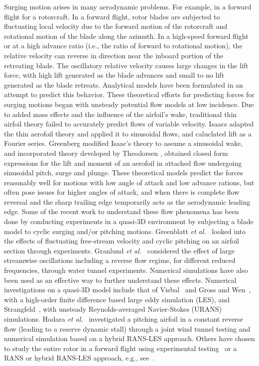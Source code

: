 Surging motion arises in many aerodynamic problems.
For example, in a forward flight for a rotorcraft.
In a forward flight, rotor blades are subjected to fluctuating local velocity due to the forward motion of the rotorcraft 
and rotational motion of the blade along the azimuth. 
In a high-speed forward flight or at a high advance ratio (i.e., the ratio of forward to rotational motion), the relative velocity 
can reverse in direction near the inboard portion of the retreating blade.
The oscillatory relative velocity causes large changes in the lift force, with high lift 
generated as the blade advances and small to no lift generated as the blade retreats. 
Analytical models have been formulated in an attempt to predict this behavior. These theoretical efforts for predicting forces for surging motions began with unsteady potential flow models at low incidence. 
Due to added mass effects and the influence of the airfoil’s wake, traditional thin airfoil theory failed to accurately predict flows of variable velocity. 
Isaacs \cite{bib:Isaacs} adapted the thin aerofoil theory and applied it to sinusoidal flows, and caluclated lift as a Fourier series.
Greenberg \cite{bib:Greenberg1947} modified Isaac's theory to assume a sinusoidal wake, and incorporated theory developed by Theodorsen \cite{bib:Theodorsen1934}, obtained closed form expressions for the lift and moment of an aerofoil in attached
flow undergoing sinusoidal pitch, surge and plunge. 
These theoretical models predict the forces reasonably well \cite{bib:greenblatt2016} for motions with low angle of attack and low advance rations, but often pose issues for higher angles of attack, and
when there is complete flow reversal and the sharp trailing edge temporarily acts as the aerodynamic leading edge. 
Some of the recent work to understand these flow phenomena has been done by conducting experiments in a quasi-3D environment by subjecting a blade model to cyclic surging and/or pitching motions.
Greenblatt \textit{et al.}~\cite{bib:greenblatt2016} looked into the effects of fluctuating free-stream velocity and cyclic pitching on an airfoil section through experiments.
Granlund \textit{et al.}~\cite{bib:granlund2016} considered the effect of large streamwise oscillations including a reverse flow regime, for different reduced frequencies, through water tunnel experiments.
Numerical simulations have also been used as an effective way to further understand these effects.
Numerical investigations on a quasi-3D model include that of Visbal~\cite{bib:visbal2014} and Gross and Wen~\cite{bib:gross2016}, with a high-order finite difference based large eddy simulation (LES), and Strangfeld~\cite{bib:stangfeld2015unsteady}, with unsteady Reynolds-averaged Navier-Stokes (URANS) simulations.
Hodara \textit{et al.}~\cite{bib:hodara2016} investigated a pitching airfoil in a constant reverse flow (leading to a reserve dynamic stall) through a joint wind tunnel testing and numerical simulation based on a hybrid RANS-LES approach.
Others have chosen to study the entire rotor in a forward flight using experimental testing~\cite{bib:norman2011} or a RANS or hybrid RANS-LES approach, e.g., see~\cite{bib:chaderjian2012detached,bib:potsdam2016}.

